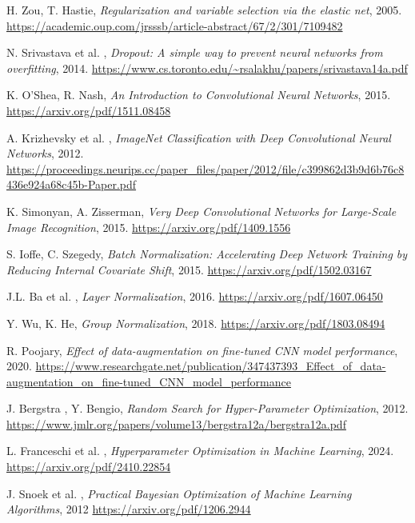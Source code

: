 \documentclass[a4paper,12pt]{report}
\begin{document}
\begin{thebibliography}{99}
		H. Zou, T. Hastie, \emph{Regularization and variable selection via the elastic net}, 2005. \url{https://academic.oup.com/jrsssb/article-abstract/67/2/301/7109482}
		
		N. Srivastava et al. , \emph{Dropout: A simple way to prevent neural networks from overfitting}, 2014. \url{https://www.cs.toronto.edu/~rsalakhu/papers/srivastava14a.pdf}
		
		K. O'Shea, R. Nash, \emph{An Introduction to Convolutional Neural Networks}, 2015. \url{https://arxiv.org/pdf/1511.08458}
		
		A. Krizhevsky et al. , \emph{ImageNet Classification with Deep Convolutional Neural Networks}, 2012. \url{https://proceedings.neurips.cc/paper_files/paper/2012/file/c399862d3b9d6b76c8436e924a68c45b-Paper.pdf}
		
		K. Simonyan, A. Zisserman, \emph{Very Deep Convolutional Networks for Large-Scale Image Recognition}, 2015. \url{https://arxiv.org/pdf/1409.1556}
		
		S. Ioffe, C. Szegedy, \emph{Batch Normalization: Accelerating Deep Network Training by Reducing Internal Covariate Shift}, 2015. \url{https://arxiv.org/pdf/1502.03167}
		
		J.L. Ba et al. , \emph{Layer Normalization}, 2016. \url{https://arxiv.org/pdf/1607.06450}
		
		Y. Wu, K. He, \emph{Group Normalization}, 2018. \url{https://arxiv.org/pdf/1803.08494}
		
		R. Poojary, \emph{Effect of data-augmentation on fine-tuned CNN model performance}, 2020. \url{https://www.researchgate.net/publication/347437393_Effect_of_data-augmentation_on_fine-tuned_CNN_model_performance}
		
		J. Bergstra , Y. Bengio, \emph{Random Search for Hyper-Parameter Optimization}, 2012. \url{https://www.jmlr.org/papers/volume13/bergstra12a/bergstra12a.pdf}
		
		L. Franceschi et al. , \emph{Hyperparameter Optimization in Machine Learning}, 2024. \url{https://arxiv.org/pdf/2410.22854}
		
		J. Snoek et al. , \emph{Practical Bayesian Optimization of Machine Learning Algorithms}, 2012 \url{https://arxiv.org/pdf/1206.2944}
		

\end{thebibliography}
\end{document}
